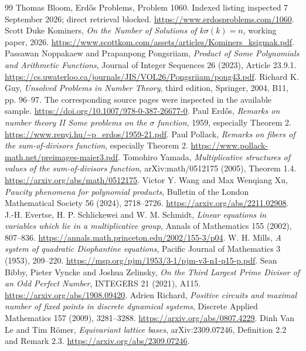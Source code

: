 \documentclass[11pt,a4paper]{article}
\theoremstyle{remark}
\begin{document}
\begin{thebibliography}{99}
\small
{} Thomas Bloom, Erd\H{o}s Problems, Problem 1060.
Indexed listing inspected 7 September 2026; direct retrieval blocked.
\url{https://www.erdosproblems.com/1060}.
 Scott Duke Kominers, \emph{On the Number of Solutions of
$k\sigma(k)=n$}, working paper, 2026.
\url{https://www.scottkom.com/assets/articles/Kominers_ksigmak.pdf}.
 Passawan Noppakaew and Prapanpong Pongsriiam,
\emph{Product of Some Polynomials and Arithmetic Functions},
Journal of Integer Sequences 26 (2023), Article 23.9.1.
\url{https://cs.uwaterloo.ca/journals/JIS/VOL26/Pongsriiam/pong43.pdf}.
 Richard K. Guy, \emph{Unsolved Problems in Number Theory},
third edition, Springer, 2004, B11, pp. 96--97. The corresponding source
pages were inspected in the available sample.
\url{https://doi.org/10.1007/978-0-387-26677-0}.
 Paul Erd\H{o}s, \emph{Remarks on number theory II
Some problems on the $\sigma$ function}, 1959, especially Theorem 2.
\url{https://www.renyi.hu/~p_erdos/1959-21.pdf}.
 Paul Pollack, \emph{Remarks on fibers of the sum-of-divisors
function}, especially Theorem 2.
\url{https://www.pollack-math.net/preimages-maier3.pdf}.
 Tomohiro Yamada, \emph{Multiplicative structures of values of
the sum-of-divisors function}, arXiv:math/0512175 (2005), Theorem 1.4.
\url{https://arxiv.org/abs/math/0512175}.
 Victor Y. Wang and Max Wenqiang Xu,
\emph{Paucity phenomena for polynomial products},
Bulletin of the London Mathematical Society 56 (2024), 2718--2726.
\url{https://arxiv.org/abs/2211.02908}.
 J.-H. Evertse, H. P. Schlickewei and W. M. Schmidt,
\emph{Linear equations in variables which lie in a multiplicative group},
Annals of Mathematics 155 (2002), 807--836.
\url{https://annals.math.princeton.edu/2002/155-3/p04}.
 W. H. Mills, \emph{A system of quadratic Diophantine equations},
Pacific Journal of Mathematics 3 (1953), 209--220.
\url{https://msp.org/pjm/1953/3-1/pjm-v3-n1-p15-p.pdf}.
 Sean Bibby, Pieter Vyncke and Joshua Zelinsky,
\emph{On the Third Largest Prime Divisor of an Odd Perfect Number},
INTEGERS 21 (2021), A115.
\url{https://arxiv.org/abs/1908.09420}.
 Adrien Richard, \emph{Positive circuits and maximal number
of fixed points in discrete dynamical systems}, Discrete Applied Mathematics
157 (2009), 3281--3288.
\url{https://arxiv.org/abs/0807.4229}.
 Dinh Van Le and Tim R\"omer, \emph{Equivariant lattice bases},
arXiv:2309.07246, Definition 2.2 and Remark 2.3.
\url{https://arxiv.org/abs/2309.07246}.
\end{thebibliography}
\end{document}
